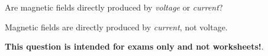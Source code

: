 

Are magnetic fields directly produced by {\it voltage} or {\it current}?







Magnetic fields are directly produced by {\it current}, not voltage.







{\bf This question is intended for exams only and not worksheets!}.



